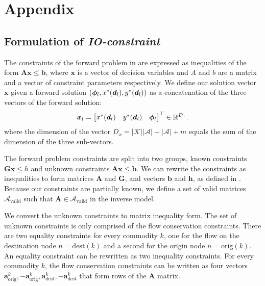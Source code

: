 \appendix
\chapter{Appendix}

\section{Formulation of \textit{IO-constraint}} \label{sec:appendix:io-constraint-formulation}

The constraints of the forward problem in \cite{ghobadiInferringLinearFeasible2021} are expressed as inequalities of the form $\bm{Ax} \leq \bm{b}$, where $\bm{x}$ is a vector of decision variables and $A$ and $b$ are a matrix and a vector of constraint parameters respectively. We define our solution vector $\bm{x}$ given a forward solution $({\bm{\phi}}_l, x^*({\bm{d}}_l), y^*({\bm{d}}_l))$ as a concatenation of the three vectors of the forward solution:
\begin{equation}
    \bm{x}_l = \begin{bmatrix}
    x^*({\bm{d}}_l) & y^*({\bm{d}}_l) & {\bm{\phi}}_l  
\end{bmatrix}^\top \in \mathbb{R}^{D_x}.
\end{equation}
where the dimension of the vector $D_x = |\mathcal{K}||\mathcal{A}| + |\mathcal{A}| + m$ equals the sum of the dimension of the three sub-vectors.

The forward problem constraints are split into two groups, known constraints $\bm{Gx} \leq h$ and unknown constraints $\bm{Ax} \leq \bm{b}$. We can rewrite the constraints as inequalities to form matrices $\bm{A}$ and $\bm{G}$, and vectors $\bm{b}$ and $\bm{h}$, as defined in \cite{ghobadiInferringLinearFeasible2021}. Because our constraints are partially known, we define a set of valid matrices $\bm{\mathcal{A}}_{\text{valid}}$ such that $\bm{A} \in  \bm{\mathcal{A}}_{\text{valid}}$ in the inverse model.

We convert the unknown constraints to matrix inequality form. The set of unknown constraints is only comprised of the flow conservation constraints. There are two equality constraints for every commodity $k$, one for the flow on the destination node $n = \mathrm{dest}(k)$ and a second for the origin node $n = \mathrm{orig}(k)$. An equality constraint can be rewritten as two inequality constraints. For every commodity $k$, the flow conservation constraints can be written as four vectors $\bm{a}^k_\text{orig}, -\bm{a}^k_\text{orig}, \bm{a}^k_\text{dest}, -\bm{a}^k_\text{dest}$ that form rows of the $\bm{A}$ matrix. 

